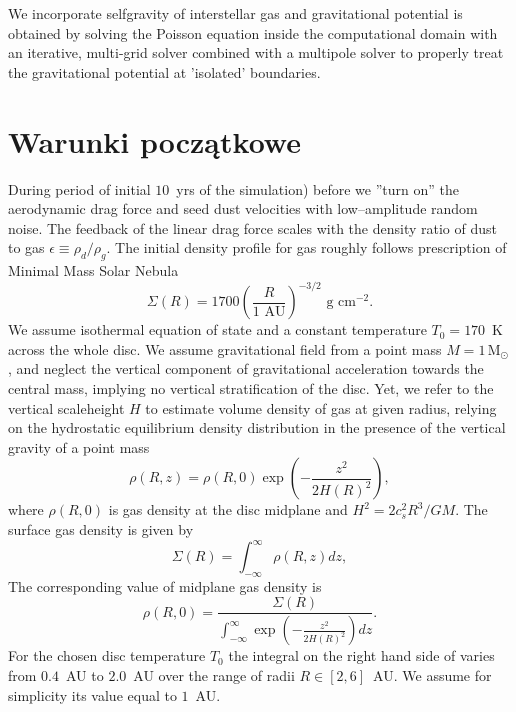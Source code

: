 We incorporate selfgravity of interstellar gas and gravitational potential is
obtained by solving the Poisson equation inside the computational
domain with an iterative, multi-grid solver
\citep{doi:10.1137/S1064827598346235} combined with a multipole solver
\citep{1977JCoPh..25...71J} to properly treat the gravitational
potential at 'isolated' boundaries.


\section{Warunki początkowe}
During period of initial $10$~yrs of the simulation) before we ''turn on'' the
aerodynamic drag force and seed dust velocities with low--amplitude random
noise. The feedback of the linear drag force scales with the density ratio of
dust to gas $\epsilon\equiv \rho_d/\rho_g$.
The initial density profile for gas roughly follows prescription of Minimal Mass
Solar Nebula~\citep{H81}
\begin{equation}
   \Sigma(R) = 1700 \left(\frac{R}{1\textrm{ AU}}\right)^{-3/2} 
   \textrm{ g cm}^{-2}.
\end{equation}
We assume isothermal equation of state and a constant temperature $T_0 = 170$~K
across the whole disc. 
We assume gravitational field from a point mass $M=1\,\textrm{M}_\odot$, and
neglect the vertical component of gravitational acceleration towards the central
mass, implying no vertical stratification of the disc. Yet, we refer to the
vertical scaleheight $H$ to estimate  volume density of gas at given radius,
relying on the hydrostatic equilibrium density distribution in the presence of
the vertical gravity of a point mass
%
\begin{equation}
   \rho(R,z) =  \rho(R,0) \exp\left(-\frac{z^2}{2H(R)^2}\right),
\end{equation}
where $\rho(R,0)$ is gas density at the disc midplane and $H^2 = 2 c_s^2 R^3/
GM$.
%
The surface gas density is given by
\begin{equation}
   \Sigma(R) = \int_{-\infty}^\infty \rho(R,z) dz,
\end{equation}
%
The corresponding value of midplane gas density is
\begin{equation}
   \label{eq:rho}
    \rho(R,0) = \frac{\Sigma(R) }{\int_{-\infty}^\infty
   \exp\left(-\frac{z^2}{2H(R)^2}\right) dz}.
\end{equation}
For the chosen disc temperature $T_0$ the integral on the right hand side of
 varies from $0.4$~AU to $2.0$~AU over the range of radii $R\in
[2,6]$~AU. 
We assume for simplicity its value equal to $1$~AU. 

